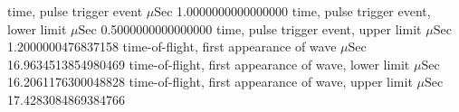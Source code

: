 \expandafter\def\csname oct2tex.alucyl_d50_v800_S.t0.d\endcsname{time, pulse trigger event}
\expandafter\def\csname oct2tex.alucyl_d50_v800_S.t0.u\endcsname{\ensuremath{\mu\text{Sec}}}
\expandafter\def\csname oct2tex.alucyl_d50_v800_S.t0.v\endcsname{1.0000000000000000}
\expandafter\def\csname oct2tex.alucyl_d50_v800_S.t0a.d\endcsname{time, pulse trigger event, lower limit}
\expandafter\def\csname oct2tex.alucyl_d50_v800_S.t0a.u\endcsname{\ensuremath{\mu\text{Sec}}}
\expandafter\def\csname oct2tex.alucyl_d50_v800_S.t0a.v\endcsname{0.5000000000000000}
\expandafter\def\csname oct2tex.alucyl_d50_v800_S.t0b.d\endcsname{time, pulse trigger event, upper limit}
\expandafter\def\csname oct2tex.alucyl_d50_v800_S.t0b.u\endcsname{\ensuremath{\mu\text{Sec}}}
\expandafter\def\csname oct2tex.alucyl_d50_v800_S.t0b.v\endcsname{1.2000000476837158}
\expandafter\def\csname oct2tex.alucyl_d50_v800_S.t1.d\endcsname{time-of-flight, first appearance of wave}
\expandafter\def\csname oct2tex.alucyl_d50_v800_S.t1.u\endcsname{\ensuremath{\mu\text{Sec}}}
\expandafter\def\csname oct2tex.alucyl_d50_v800_S.t1.v\endcsname{16.9634513854980469}
\expandafter\def\csname oct2tex.alucyl_d50_v800_S.t1a.d\endcsname{time-of-flight, first appearance of wave, lower limit}
\expandafter\def\csname oct2tex.alucyl_d50_v800_S.t1a.u\endcsname{\ensuremath{\mu\text{Sec}}}
\expandafter\def\csname oct2tex.alucyl_d50_v800_S.t1a.v\endcsname{16.2061176300048828}
\expandafter\def\csname oct2tex.alucyl_d50_v800_S.t1b.d\endcsname{time-of-flight, first appearance of wave, upper limit}
\expandafter\def\csname oct2tex.alucyl_d50_v800_S.t1b.u\endcsname{\ensuremath{\mu\text{Sec}}}
\expandafter\def\csname oct2tex.alucyl_d50_v800_S.t1b.v\endcsname{17.4283084869384766}
